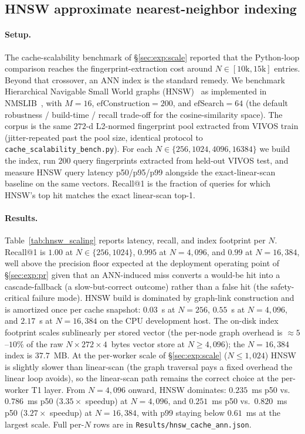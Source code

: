 \documentclass[a4paper,fleqn]{cas-dc}
\begin{document}
\subsection{HNSW approximate nearest-neighbor indexing}\label{app:aux:hnsw}

\paragraph{Setup.} The cache-scalability benchmark of \S\ref{sec:exp:scale} reported that the Python-loop comparison reaches the fingerprint-extraction cost around $N \in [10\mathrm{k}, 15\mathrm{k}]$ entries. Beyond that crossover, an ANN index is the standard remedy. We benchmark Hierarchical Navigable Small World graphs (HNSW)~\citep{malkov2018hnsw} as implemented in NMSLIB~\citep{boytsov2013nmslib}, with $M = 16$, $\mathrm{efConstruction} = 200$, and $\mathrm{efSearch} = 64$ (the default robustness / build-time / recall trade-off for the cosine-similarity space). The corpus is the same $272$-d L2-normed fingerprint pool extracted from VIVOS train (jitter-repeated past the pool size, identical protocol to \texttt{cache\_scalability\_bench.py}). For each $N \in \{256, 1024, 4096, 16384\}$ we build the index, run $200$ query fingerprints extracted from held-out VIVOS test, and measure HNSW query latency p50/p95/p99 alongside the exact-linear-scan baseline on the same vectors. Recall@1 is the fraction of queries for which HNSW's top hit matches the exact linear-scan top-1.

\paragraph{Results.} Table~\ref{tab:hnsw_scaling} reports latency, recall, and index footprint per $N$. Recall@1 is $1.00$ at $N \in \{256, 1024\}$, $0.995$ at $N = 4{,}096$, and $0.99$ at $N = 16{,}384$, well above the precision floor expected at the deployment operating point of \S\ref{sec:exp:pr} given that an ANN-induced miss converts a would-be hit into a cascade-fallback (a slow-but-correct outcome) rather than a false hit (the safety-critical failure mode). HNSW build is dominated by graph-link construction and is amortized once per cache snapshot: $0.03$~s at $N=256$, $0.55$~s at $N=4{,}096$, and $2.17$~s at $N=16{,}384$ on the CPU development host. The on-disk index footprint scales sublinearly per stored vector (the per-node graph overhead is $\approx 5$--$10\%$ of the raw $N \times 272 \times 4$~bytes vector store at $N \geq 4{,}096$); the $N=16{,}384$ index is $37.7$~MB. At the per-worker scale of \S\ref{sec:exp:scale} ($N \leq 1{,}024$) HNSW is slightly slower than linear-scan (the graph traversal pays a fixed overhead the linear loop avoids), so the linear-scan path remains the correct choice at the per-worker T1 layer. From $N = 4{,}096$ onward, HNSW dominates: $0.235$~ms p50 vs.\ $0.786$~ms p50 ($3.35\times$ speedup) at $N=4{,}096$, and $0.251$~ms p50 vs.\ $0.820$~ms p50 ($3.27\times$ speedup) at $N=16{,}384$, with p99 staying below $0.61$~ms at the largest scale. Full per-$N$ rows are in \texttt{Results/hnsw\_cache\_ann.json}.
\end{document}
